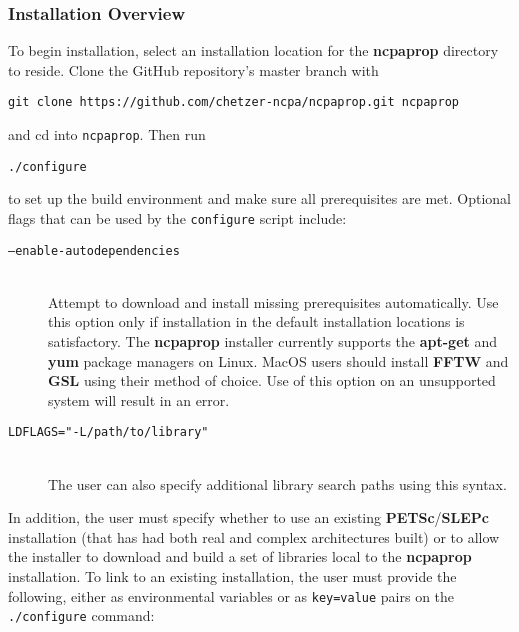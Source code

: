 \subsubsection{Installation Overview}

To begin installation, select an installation location for the \textbf{ncpaprop} directory to reside.  Clone the GitHub repository's master branch with

\texttt{git clone https://github.com/chetzer-ncpa/ncpaprop.git ncpaprop}

\noindent
and cd into \texttt{ncpaprop}.  Then run

\texttt{./configure}

\noindent
to set up the build environment and make sure all prerequisites are met.  Optional flags that can be used by the \texttt{configure} script include:

\begin{description}
\item[\texttt{--enable-autodependencies}]\hfill \\
\noindent
Attempt to download and install missing prerequisites automatically. Use this option only if installation in the default installation locations is satisfactory. The \textbf{ncpaprop} installer currently supports the \textbf{apt-get} and \textbf{yum} package managers on Linux.  MacOS users should install \textbf{FFTW} and \textbf{GSL} using their method of choice.  Use of this option on an unsupported system will result in an error.

\item[\texttt{LDFLAGS="-L/path/to/library"}]\hfill \\
\noindent
The user can also specify additional library search paths using this syntax.
\end{description}

\noindent In addition, the user must specify whether to use an existing \textbf{PETSc}/\textbf{SLEPc} installation (that has had both real and complex architectures built) or to allow the installer to download and build a set of libraries local to the \textbf{ncpaprop} installation.  To link to an existing installation, the user must provide the following, either as environmental variables or as \texttt{key=value} pairs on the \texttt{./configure} command:

